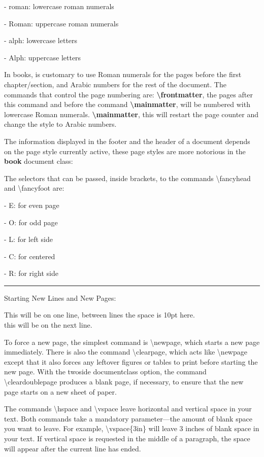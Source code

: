 \documentclass[12pt,openright]{book}
\begin{document}
- roman: lowercase roman numerals

- Roman: uppercase roman numerals

- alph: lowercase letters

- Alph: uppercase letters

In books, is customary to use Roman numerals for the pages before the first chapter/section, and Arabic numbers for the rest of the document. The commands that control the page numbering are: \textbf{\textbackslash frontmatter}, the pages after this command and before the command \textbf{\textbackslash mainmatter}, will be numbered with lowercase Roman numerals. \textbf{\textbackslash mainmatter}, this will restart the page counter and change the style to Arabic numbers.

The information displayed in the footer and the header of a document depends on the page style currently active, these page styles are more notorious in the \textbf{book} document class:

The selectors that can be passed, inside brackets, to the commands \textbackslash fancyhead and \textbackslash fancyfoot are:

- E: for even page

- O: for odd page

- L: for left side

- C: for centered

- R: for right side

\vskip 0.05in
\rule{\textwidth}{0.5pt}
\vskip 0.05in

Starting New Lines and New Pages:

This will be on one line, between lines the space is 10pt here. \\[10pt] this will be on the next line. 

To force a new page, the simplest command is \textbackslash newpage, which starts a new page immediately. There is also the command \textbackslash clearpage, which acts like \textbackslash newpage except that it also forces any leftover figures or tables to print before starting the new page. With the twoside documentclass option, the command \textbackslash cleardoublepage produces a blank page, if necessary, to ensure that the new page starts on a new sheet of paper.

The commands \textbackslash hspace and \textbackslash vspace leave horizontal and vertical space in your text. Both commands take a mandatory parameter—the amount of blank space you want to leave. For example, \textbackslash vspace\{3in\} will leave 3 inches of blank space in your text. If vertical space is requested in the middle of a paragraph, the space will appear after the current line has ended.
\end{document}
